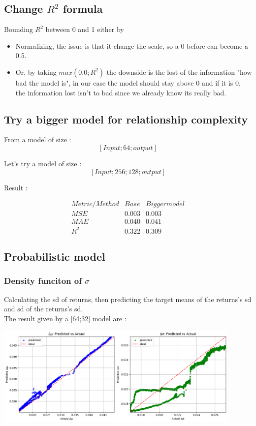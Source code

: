 \documentclass[letterpaper,11pt]{article}
\begin{document}
\subsection*{Change $R^2$ formula}
Bounding $R^2$ between 0 and 1 either by \begin{itemize}
  \item Normalizing, the issue is that it change the scale, so a 0 before can become a 0.5.
  \item Or, by taking \textbf{$max(0.0 ; R^2)$} the downside is the lost of the information "how bad the model is", in our case the model should stay above 0 and if it is 0, the information lost isn't to bad since we already know its really bad.
\end{itemize}


\subsection*{Try a bigger model for relationship complexity}
From a model of size :
\[
[Input; 64; output]
\]

Let's try a model of size : 
\[
[Input; 256; 128; output]
\]

Result :

\bigskip
\[
\begin{array}{ccc}
Metric/Method & Base & Bigger model \\
\hline
MSE & 0.003 & 0.003\\
MAE & 0.040 & 0.041 \\
R^{2} & 0.322 & 0.309 
\end{array}
\]

\bigskip

\subsection*{Probabilistic model}


\subsubsection*{Density funciton of $\sigma$}

Calculating the sd of returns, then predicting the target means of the returns's sd and sd of the returns's sd.\\
The result given by a [64;32] model are :
\begin{center}
\includegraphics[width=0.9\textwidth]{img/mu_sig_pred_sig.png}
\end{center}
\end{document}
